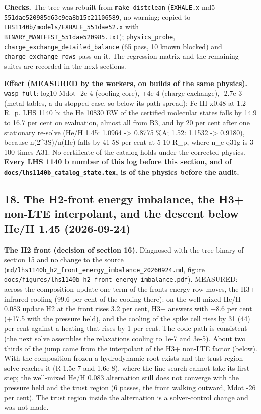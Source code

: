\documentclass[english,a4paper]{my_memo}
\begin{document}
\textbf{Checks.} The tree was rebuilt from \texttt{make\ distclean} (\texttt{EXHALE.x} md5
\texttt{551dae520985d63c9ea8b15c21106589}, no warning; copied to
\texttt{LHS1140b/models/EXHALE\_551dae52.x} with \texttt{BINARY\_MANIFEST\_551dae520985.txt});
\texttt{physics\_probe}, \texttt{charge\_exchange\_detailed\_balance} (65 pass, 10 known
blocked) and \texttt{charge\_exchange\_rows} pass on it. The regression matrix and
the remaining suites are recorded in the next sections.

\textbf{Effect (MEASURED by the workers, on builds of the same physics).}
\texttt{wasp\_full}: log10 Mdot -2e-4 (cooling core), +4e-4 (charge exchange), -2.7e-3
(metal tables, a du-stopped case, so below its path spread); Fe III x0.48
at 1.2 R\_p. LHS 1140 b: the He 10830 EW of the certified molecular states
falls by 14.9 to 16.7 per cent on evaluation, almost all from B3, and by 20
per cent after one stationary re-solve (He/H 1.45: 1.0964 -\textgreater{} 0.8775 \%A;
1.52: 1.1532 -\textgreater{} 0.9180), because n(2\^{}3S)/n(He) falls by 41-58 per cent at
5-10 R\_p, where n\_e q31g is 3-100 times A31. No certificate of the catalog
holds under the corrected physics. \textbf{Every LHS 1140 b number of this log
before this section, and of \texttt{docs/lhs1140b\_catalog\_state.tex}, is of the
physics before the audit.}

\subsection{18. The H2-front energy imbalance, the H3+ non-LTE interpolant, and the descent below He/H 1.45 (2026-09-24)}\label{18-the-h2-front-energy-imbalance-the-h3-non-lte-interpolant-and-the-descent-below-heh-145-2026-09-24}

\textbf{The H2 front (decision of section 16).} Diagnosed with the tree binary of
section 15 and no change to the source
(\texttt{md/lhs1140b\_h2\_front\_energy\_imbalance\_20260924.md}, figure
\texttt{docs/figures/lhs1140b\_h2\_front\_energy\_imbalance.pdf}). MEASURED: across the
composition update one term of the front\textquotesingle s energy row moves, the H3+
infrared cooling (99.6 per cent of the cooling there): on the well-mixed
He/H 0.083 update H2 at the front rises 3.2 per cent, H3+ answers with +8.6
per cent (+17.5 with the pressure held), and the cooling of the spike cell
rises by 31 (44) per cent against a heating that rises by 1 per cent. The
code path is consistent (the next solve assembles the relaxation\textquotesingle s cooling
to 1e-7 and 3e-5). About two thirds of the jump came from the interpolant of
the H3+ non-LTE factor (below). With the composition frozen a hydrodynamic
root exists and the trust-region solve reaches it (\textbar\textbar R\textbar\textbar{} 1.5e-7 and 1.6e-8),
where the line search cannot take its first step; the well-mixed He/H 0.083
alternation still does not converge with the pressure held and the trust
region (6 passes, the front walking outward, Mdot -26 per cent). The
trust region inside the alternation is a solver-control change and was not
made.
\end{document}
